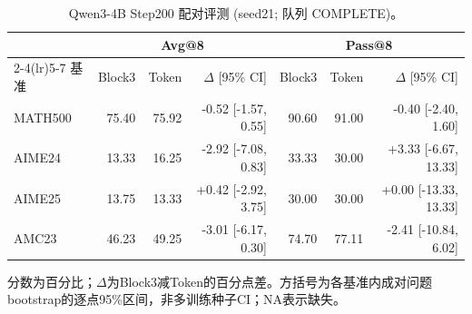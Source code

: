 \begin{table}[t]
\centering
\scriptsize
\setlength{\tabcolsep}{4pt}
\caption{Qwen3-4B Step200 配对评测 (seed21; 队列 COMPLETE)。}
\label{tab:qwen4endpoint}
\begin{tabular}{lrrrrrr}
\toprule
 & \multicolumn{3}{c}{Avg@8} & \multicolumn{3}{c}{Pass@8} \\
\cmidrule(lr){2-4}\cmidrule(lr){5-7}
基准 & Block3 & Token & $\Delta$ [95\% CI] & Block3 & Token & $\Delta$ [95\% CI] \\
\midrule
MATH500 & 75.40 & 75.92 & -0.52 [-1.57, 0.55] & 90.60 & 91.00 & -0.40 [-2.40, 1.60] \\
AIME24 & 13.33 & 16.25 & -2.92 [-7.08, 0.83] & 33.33 & 30.00 & +3.33 [-6.67, 13.33] \\
AIME25 & 13.75 & 13.33 & +0.42 [-2.92, 3.75] & 30.00 & 30.00 & +0.00 [-13.33, 13.33] \\
AMC23 & 46.23 & 49.25 & -3.01 [-6.17, 0.30] & 74.70 & 77.11 & -2.41 [-10.84, 6.02] \\
\bottomrule
\end{tabular}
\par\smallskip\footnotesize 分数为百分比；$\Delta$为Block3减Token的百分点差。方括号为各基准内成对问题bootstrap的逐点95\%区间，非多训练种子CI；NA表示缺失。
\end{table}

